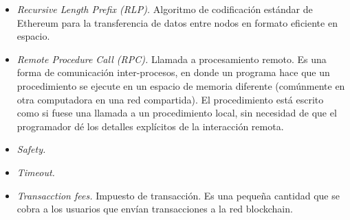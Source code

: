 \begin{itemize}
     \item \textit{Recursive Length Prefix (RLP).} Algoritmo de codificación estándar de Ethereum para la transferencia de datos
     entre nodos en formato eficiente en espacio.
     \item \textit{Remote Procedure Call (RPC).} Llamada a procesamiento remoto. Es una forma de comunicación inter-procesos,
     en donde un programa hace que un procedimiento se ejecute en un espacio de memoria diferente (comúnmente en otra computadora
     en una red compartida). El procedimiento  está escrito como si fuese una llamada a un procedimiento local, sin necesidad de
     que el programador dé los detalles explícitos de la interacción remota.
     \item \textit{Safety.}
     \item \textit{Timeout.} 
     \item \textit{Transacction fees.} Impuesto de transacción. Es una pequeña cantidad que se cobra a los
     usuarios que envían transacciones a la red blockchain.  
\end{itemize}